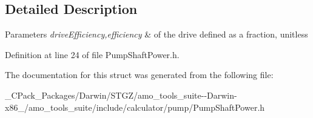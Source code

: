 \subsection{Detailed Description}

\begin{DoxyParams}{Parameters}
{\em drive\+Efficiency,efficiency} & of the drive defined as a fraction, unitless \\
\hline
\end{DoxyParams}


Definition at line 24 of file Pump\+Shaft\+Power.\+h.



The documentation for this struct was generated from the following file\+:\begin{DoxyCompactItemize}
\item 
\+\_\+\+C\+Pack\+\_\+\+Packages/\+Darwin/\+S\+T\+G\+Z/amo\+\_\+tools\+\_\+suite-\/-\/\+Darwin-\/x86\+\_/amo\+\_\+tools\+\_\+suite/include/calculator/pump/Pump\+Shaft\+Power.\+h\end{DoxyCompactItemize}
